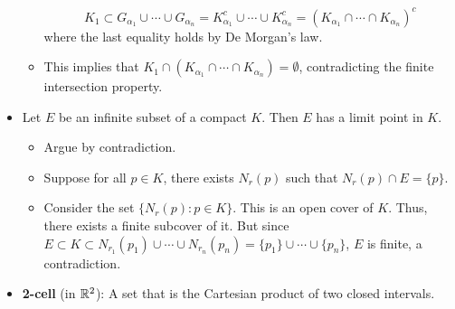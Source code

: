 \documentclass[../../notes.tex]{subfiles}
\begin{document}
\begin{itemize}
\begin{itemize}
\begin{equation*}
            K_1 \subset G_{\alpha_1}\cup\cdots\cup G_{\alpha_n} = K_{\alpha_1}^c\cup\cdots\cup K_{\alpha_n}^c = (K_{\alpha_1}\cap\cdots\cap K_{\alpha_n})^c
        \end{equation*}
        where the last equality holds by De Morgan's law.
        \item This implies that $K_1\cap(K_{\alpha_1}\cap\cdots\cap K_{\alpha_n})=\emptyset$, contradicting the finite intersection property.
    \end{itemize}
    \item Let $E$ be an infinite subset of a compact $K$. Then $E$ has a limit point in $K$.
    \begin{itemize}
        \item Argue by contradiction.
        \item Suppose for all $p\in K$, there exists $N_r(p)$ such that $N_r(p)\cap E=\{p\}$.
        \item Consider the set $\{N_r(p):p\in K\}$. This is an open cover of $K$. Thus, there exists a finite subcover of it. But since $E\subset K\subset N_{r_1}(p_1)\cup\cdots\cup N_{r_n}(p_n)=\{p_1\}\cup\cdots\cup\{p_n\}$, $E$ is finite, a contradiction.
    \end{itemize}
    \item \textbf{2-cell} (in $\mathbb{R}^2$): A set that is the Cartesian product of two closed intervals.
    \begin{figure}[h!]
        \centering
\end{figure}
\end{itemize}
\end{document}
